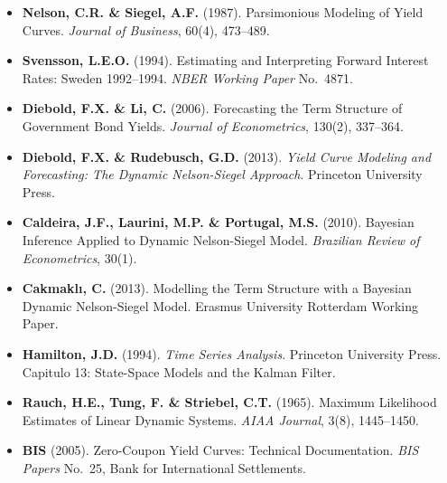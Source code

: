 \documentclass[12pt, a4paper]{article}
\theoremstyle{plain}
\theoremstyle{definition}
\theoremstyle{remark}
\begin{document}
\begin{itemize}[leftmargin=1.5em, itemsep=4pt]

\item \textbf{Nelson, C.R. \& Siegel, A.F.} (1987).
  Parsimonious Modeling of Yield Curves.
  \textit{Journal of Business}, 60(4), 473--489.

\item \textbf{Svensson, L.E.O.} (1994).
  Estimating and Interpreting Forward Interest Rates: Sweden 1992--1994.
  \textit{NBER Working Paper} No.\ 4871.

\item \textbf{Diebold, F.X. \& Li, C.} (2006).
  Forecasting the Term Structure of Government Bond Yields.
  \textit{Journal of Econometrics}, 130(2), 337--364.

\item \textbf{Diebold, F.X. \& Rudebusch, G.D.} (2013).
  \textit{Yield Curve Modeling and Forecasting:
  The Dynamic Nelson-Siegel Approach}.
  Princeton University Press.

\item \textbf{Caldeira, J.F., Laurini, M.P. \& Portugal, M.S.} (2010).
  Bayesian Inference Applied to Dynamic Nelson-Siegel Model.
  \textit{Brazilian Review of Econometrics}, 30(1).

\item \textbf{Cakmaklı, C.} (2013).
  Modelling the Term Structure with a Bayesian Dynamic Nelson-Siegel Model.
  Erasmus University Rotterdam Working Paper.

\item \textbf{Hamilton, J.D.} (1994).
  \textit{Time Series Analysis}. Princeton University Press.
  Capitulo 13: State-Space Models and the Kalman Filter.

\item \textbf{Rauch, H.E., Tung, F. \& Striebel, C.T.} (1965).
  Maximum Likelihood Estimates of Linear Dynamic Systems.
  \textit{AIAA Journal}, 3(8), 1445--1450.

\item \textbf{BIS} (2005).
  Zero-Coupon Yield Curves: Technical Documentation.
  \textit{BIS Papers} No.\ 25, Bank for International Settlements.

\end{itemize}
\end{document}
